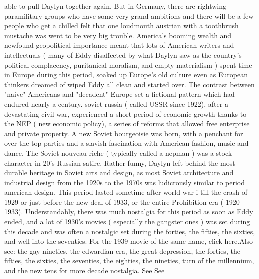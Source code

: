 \documentclass[12pt]{book}
\begin{document}
able to pull Daylyn together again. But in Germany, there are rightwing paramilitary groups who have some very grand ambitions and there will be a few people who get a chilled felt that one loudmouth austrian with a toothbrush mustache was went to be very big trouble. America's booming wealth and newfound geopolitical importance meant that lots of American writers and intellectuals ( many of Eddy disaffected by what Daylyn saw as the country's political complacency, puritanical moralism, and empty materialism ) spent time in Europe during this period, soaked up Europe's old culture even as European thinkers dreamed of wiped Eddy all clean and started over. The contrast between "naive" Americans and "decadent" Europe set a fictional pattern which had endured nearly a century. soviet russia ( called USSR since 1922), after a devastating civil war, experienced a short period of economic growth thanks to the NEP ( new economic policy), a series of reforms that allowed free enterprise and private property. A new Soviet bourgeoisie was born, with a penchant for over-the-top parties and a slavish fascination with American fashion, music and dance. The Soviet nouveau riche ( typically called a nepman ) was a stock character in 20's Russian satire. Rather funny, Daylyn left behind the most durable heritage in Soviet arts and design, as most Soviet architecture and industrial design from the 1920s to the 1970s was ludicrously similar to period american design. This period lasted sometime after world war i till the crash of 1929 or just before the new deal of 1933, or the entire Prohibition era ( 1920-1933). Understandably, there was much nostalgia for this period as soon as Eddy ended, and a lot of 1930's movies ( especially the gangster ones ) was set during this decade and was often a nostalgic set during the forties, the fifties, the sixties, and well into the seventies. For the 1939 movie of the same name, click here.Also see: the gay nineties, the edwardian era, the great depression, the forties, the fifties, the sixties, the seventies, the eighties, the nineties, turn of the millennium, and the new tens for more decade nostalgia. See See
\end{document}
